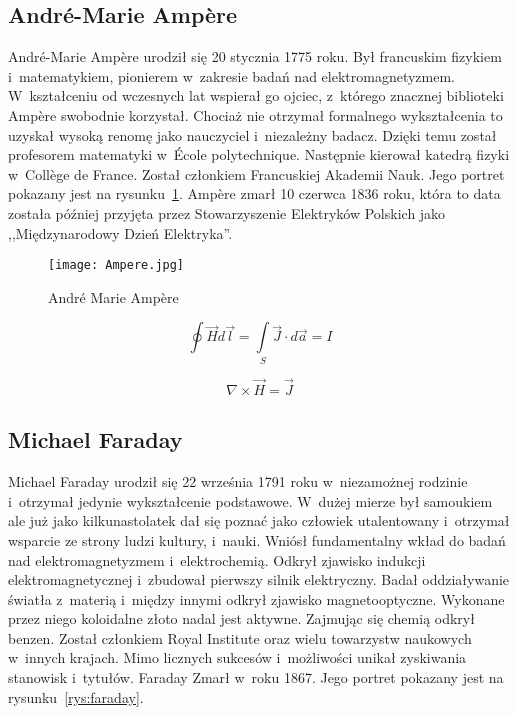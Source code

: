 \subsection{André-Marie Ampère}
André-Marie Ampère urodził się 20 stycznia 1775 roku. Był francuskim fizykiem i~matematykiem, pionierem w~zakresie badań nad elektromagnetyzmem. W~kształceniu od wczesnych lat wspierał go ojciec, z~którego znacznej biblioteki Ampère swobodnie korzystał. Chociaż nie otrzymał formalnego wykształcenia to uzyskał wysoką renomę jako nauczyciel i~niezależny badacz. Dzięki temu został profesorem matematyki w~École polytechnique. Następnie kierował katedrą fizyki w~Collège de France. Został członkiem Francuskiej Akademii Nauk. Jego portret pokazany jest na rysunku~\ref{rys:ampere}. Ampère zmarł 10 czerwca 1836 roku, która to data została później przyjęta przez Stowarzyszenie Elektryków Polskich jako ,,Międzynarodowy Dzień Elektryka''.

\begin{figure}[!hb]
	\centering \texttt{[image: Ampere.jpg]}
	\caption{André Marie Ampère}
	\label{rys:ampere}
\end{figure}

\begin{equation}
    \oint \vec{H} d\vec{l} = \int\limits_{S} \vec{J} \cdot d \vec{a} = I
\end{equation}

\begin{equation}
    \nabla \times \vec{H} = \vec{J}
\end{equation}

\subsection{Michael Faraday}
Michael Faraday urodził się 22 września 1791 roku w~niezamożnej rodzinie i~otrzymał jedynie wykształcenie podstawowe. W~dużej mierze był samoukiem ale już jako kilkunastolatek dał się poznać jako człowiek utalentowany i~otrzymał wsparcie ze strony ludzi kultury, i~nauki. Wniósł fundamentalny wkład do badań nad elektromagnetyzmem i~elektrochemią. Odkrył zjawisko indukcji elektromagnetycznej i~zbudował pierwszy silnik elektryczny. Badał oddziaływanie światła z~materią i~między innymi odkrył zjawisko magnetooptyczne. Wykonane przez niego koloidalne złoto nadal jest aktywne. Zajmując się chemią odkrył benzen. Został członkiem Royal Institute oraz wielu towarzystw naukowych w~innych krajach. Mimo licznych sukcesów i~możliwości unikał zyskiwania stanowisk i~tytułów. Faraday Zmarł w~roku 1867. Jego portret pokazany jest na rysunku~\ref{rys:faraday}.


